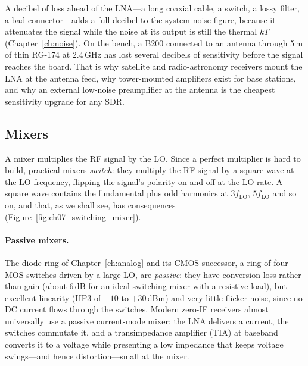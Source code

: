\begin{pitfall}
A decibel of loss ahead of the LNA---a long coaxial cable, a switch, a lossy filter, a bad connector---adds
a full decibel to the system noise figure, because it attenuates the signal while the noise at its output
is still the thermal $kT$ (Chapter~\ref{ch:noise}). On the bench, a B200 connected to an antenna through
5\,m of thin RG-174 at 2.4\,GHz has lost several decibels of sensitivity before the signal reaches the
board. That is why satellite and radio-astronomy receivers mount the LNA at the antenna feed, why tower-mounted
amplifiers exist for base stations, and why an external low-noise preamplifier at the antenna is the
cheapest sensitivity upgrade for any SDR.
\end{pitfall}


\subsection{Mixers}

A mixer multiplies the RF signal by the LO. Since a perfect multiplier is hard to build, practical
mixers \emph{switch}: they multiply the RF signal by a square wave at the LO frequency, flipping the
signal's polarity on and off at the LO rate. A square wave contains the fundamental plus odd harmonics
at $3f_{\text{LO}}$, $5f_{\text{LO}}$ and so on, and that, as we shall see, has consequences
(Figure~\ref{fig:ch07_switching_mixer}).

\paragraph{Passive mixers.} The diode ring of Chapter~\ref{ch:analog} and its CMOS successor, a ring of
four MOS switches driven by a large LO, are \emph{passive}: they have conversion loss rather than gain
(about 6\,dB for an ideal switching mixer with a resistive load), but excellent linearity (IIP3 of
$+10$ to $+30$\,dBm) and very little flicker noise, since no DC current flows through the switches. Modern
zero-IF receivers almost universally use a passive current-mode mixer: the LNA delivers a current, the
switches commutate it, and a transimpedance amplifier (TIA) at baseband converts it to a voltage while
presenting a low impedance that keeps voltage swings---and hence distortion---small at the mixer.

